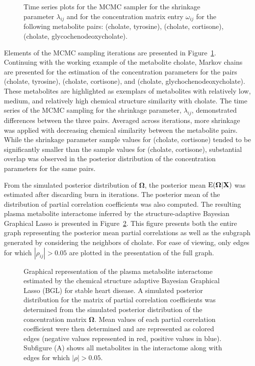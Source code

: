 \begin{figure}[h!]
	\caption[Add caption]{Time series plots for the MCMC sampler for the shrinkage parameter $\lambda_{ij}$ and for the concentration matrix entry $\omega_{ij}$ for the following metabolite pairs: (cholate, tyrosine), (cholate, cortisone), (cholate, glycochenodeoxycholate).  \label{fig:mcmc} }
\end{figure}

Elements of the MCMC sampling iterations are presented in Figure~\ref{fig:mcmc}. Continuing with the working example of the metabolite cholate, Markov chains are presented for the estimation of the concentration parameters for the pairs (cholate, tyrosine), (cholate, cortisone), and (cholate, glychochenodeoxycholate). These metabolites are highlighted as exemplars of metabolites with relatively low, medium, and relatively high chemical structure similarity with cholate. The time series of the MCMC sampling for the shrinkage parameter, $\lambda_{ij}$, demonstrated differences between the three pairs. Averaged across iterations, more shrinkage was applied with decreasing chemical similarity between the metabolite pairs. While the shrinkage parameter sample values for (cholate, cortisone) tended to be significantly smaller than the sample values for (cholate, cortisone), substantial overlap was observed in the posterior distribution of the concentration parameters for the same pairs.

From the simulated posterior distribution of $\boldsymbol{\Omega}$, the posterior mean $\operatorname{E}(\boldsymbol{\Omega}|\textbf{X})$ was estimated after discarding burn in iterations. The posterior mean of the distribution of partial correlation coefficients was also computed. The resulting plasma metabolite interactome inferred by the structure-adaptive Bayesian Graphical Lasso is presented in Figure~\ref{fig:stableInter}. This figure presents both the entire graph representing the posterior mean partial correlations as well as the subgraph generated by considering the neighbors of cholate. For ease of viewing, only edges for which $|\rho_{ij}|>0.05$ are plotted in the presentation of the full graph. 

\begin{figure}[h!]
	\caption[Add caption]{Graphical representation of the plasma metabolite interactome estimated by the chemical structure adaptive Bayesian Graphical Lasso (BGL) for stable heart disease. A simulated posterior distribution for the matrix of partial correlation coefficients was determined from the simulated posterior distribution of the concentration matrix $\boldsymbol{\Omega}$.  Mean values of each partial correlation coefficient were then determined and are represented as colored edges (negative values represented in red, positive values in blue). Subfigure (A) shows all metabolites in the interactome along with edges for which $|\rho|>0.05$.   \label{fig:stableInter} }
\end{figure}

